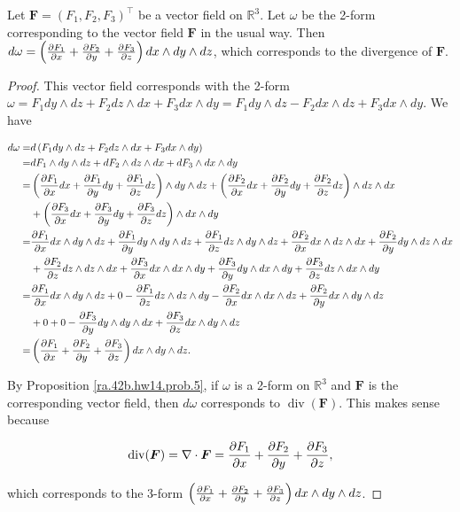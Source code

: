 \begin{proposition}

Let \(\boldsymbol{F}= (F_1, F_2, F_3)^\top\) be a vector field on \(\mathbb{R}^3\). Let \(\omega\) be the 2-form corresponding to the vector field \(\boldsymbol{F}\) in the usual way. Then \(d \omega = \left( \pderiv{F_1}{x}  + \pderiv{F_2}{y} +  \pderiv{F_3}{z}  \right) dx \wedge dy  \wedge dz\), which corresponds to the divergence of \(\boldsymbol{F}\).

\end{proposition}

\begin{proof}

This vector field corresponds with the 2-form \(\omega = F_1 dy \wedge dz + F_2 dz \wedge dx + F_3 dx \wedge dy = F_1 dy \wedge dz - F_2 dx \wedge dz + F_3 dx \wedge dy \). We have

\begin{align*}
d \omega  = &  d \left(F_1 dy \wedge dz + F_2 dz \wedge dx + F_3 dx \wedge dy\right)
\\ = & d F_1 \wedge dy \wedge dz + dF_2 \wedge dz \wedge dx + dF_3 \wedge dx \wedge dy
\\  = &  \left( \pderiv{F_1}{x} dx +\pderiv{F_1}{y} dy + \pderiv{F_1}{z} dz \right) \wedge dy \wedge dz + \left( \pderiv{F_2}{x} dx +\pderiv{F_2}{y} dy + \pderiv{F_2}{z} dz \right) \wedge dz \wedge dx 
\\ & + \left( \pderiv{F_3}{x} dx +\pderiv{F_3}{y} dy + \pderiv{F_3}{z} dz \right)\wedge dx \wedge dy
\\  = &  \pderiv{F_1}{x} dx  \wedge dy \wedge dz  + \pderiv{F_1}{y} dy \wedge dy \wedge dz  +   \pderiv{F_1}{z} dz  \wedge dy \wedge dz 
+ \pderiv{F_2}{x} dx \wedge dz \wedge dx + \pderiv{F_2}{y} dy \wedge dz \wedge dx 
\\ &  + \pderiv{F_2}{z} dz \wedge dz \wedge dx 
+  \pderiv{F_3}{x} dx  \wedge dx \wedge dy +  \pderiv{F_3}{y} dy \wedge dx \wedge dy +  \pderiv{F_3}{z} dz \wedge dx \wedge dy
\\  = &  \pderiv{F_1}{x} dx  \wedge dy \wedge dz  + 0 -   \pderiv{F_1}{z} dz  \wedge dz \wedge dy
-  \pderiv{F_2}{x} dx \wedge dx \wedge dz + \pderiv{F_2}{y} dx \wedge dy \wedge dz
\\ &  + 0
+ 0 -  \pderiv{F_3}{y} dy \wedge dy \wedge dx +  \pderiv{F_3}{z}  dx \wedge dy  \wedge dz
\\  = & \left( \pderiv{F_1}{x}  + \pderiv{F_2}{y} +  \pderiv{F_3}{z}  \right) dx \wedge dy  \wedge dz.
\end{align*}


By Proposition \ref{ra.42b.hw14.prob.5}, if \(\omega\) is a 2-form on \(\mathbb{R}^3\) and \(\boldsymbol{F}\) is the  corresponding vector field, then \(d \omega\) corresponds to \(\operatorname{div}(\boldsymbol{F})\). This makes sense because

\[
\operatorname{div}(\boldsymbol{F}) =  \nabla \cdot \boldsymbol{F} = \pderiv{F_1}{x} + \pderiv{F_2}{y} + \pderiv{F_3}{z},
\]

which corresponds to the 3-form \(\left( \pderiv{F_1}{x}  + \pderiv{F_2}{y} +  \pderiv{F_3}{z}  \right) dx \wedge dy  \wedge dz\).

\end{proof}

